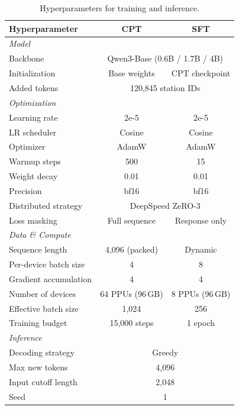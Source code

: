 \documentclass{article}
\begin{document}
\begin{table}[t]
\centering
\caption{Hyperparameters for training and inference.}
\label{tab:hyperparams}
\small
\setlength{\tabcolsep}{8pt}
\begin{tabular}{@{}lcc@{}}
\toprule
\textbf{Hyperparameter} & \textbf{CPT} & \textbf{SFT} \\
\midrule
\multicolumn{3}{l}{\textit{Model}} \\[2pt]
\quad Backbone & \multicolumn{2}{c}{Qwen3-Base (0.6B / 1.7B / 4B)} \\
\quad Initialization & Base weights & CPT checkpoint \\
\quad Added tokens & \multicolumn{2}{c}{120,845 station IDs} \\
\midrule
\multicolumn{3}{l}{\textit{Optimization}} \\[2pt]
\quad Learning rate & 2e-5 & 2e-5 \\
\quad LR scheduler & Cosine & Cosine \\
\quad Optimizer & AdamW & AdamW \\
\quad Warmup steps & 500 & 15 \\
\quad Weight decay & 0.01 & 0.01 \\
\quad Precision & bf16 & bf16 \\
\quad Distributed strategy & \multicolumn{2}{c}{DeepSpeed ZeRO-3} \\
\quad Loss masking & Full sequence & Response only \\
\midrule
\multicolumn{3}{l}{\textit{Data \& Compute}} \\[2pt]
\quad Sequence length & 4,096 (packed) & Dynamic \\
\quad Per-device batch size & 4 & 8 \\
\quad Gradient accumulation & 4 & 4 \\
\quad Number of devices & 64 PPUs (96\,GB) & 8 PPUs (96\,GB) \\
\quad Effective batch size & 1,024 & 256 \\
\quad Training budget & 15,000 steps & 1 epoch \\
\midrule
\multicolumn{3}{l}{\textit{Inference}} \\[2pt]
\quad Decoding strategy & \multicolumn{2}{c}{Greedy} \\
\quad Max new tokens & \multicolumn{2}{c}{4,096} \\
\quad Input cutoff length & \multicolumn{2}{c}{2,048} \\
\quad Seed & \multicolumn{2}{c}{1} \\
\bottomrule
\end{tabular}
\end{table}
\end{document}
